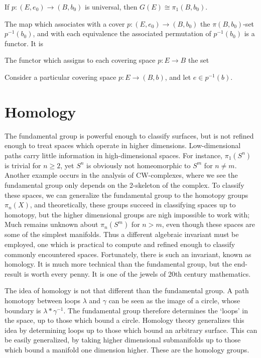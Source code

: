 \begin{corollary}
    If $p: (E,e_0) \to (B,b_0)$ is universal, then $G(E) \cong \pi_1(B,b_0)$.
\end{corollary}

The map which associates with a cover $p: (E,e_0) \to (B,b_0)$ the $\pi(B,b_0)$-set $p^{-1}(b_0)$, and with each equivalence the associated permutation of $p^{-1}(b_0)$ is a functor. It is

The functor which assigns to each covering space $p: E \to B$ the set 

Consider a particular covering space $p: E \to (B,b)$, and let $e \in p^{-1}(b)$.






\chapter{Homology}

The fundamental group is powerful enough to classify surfaces, but is not refined enough to treat spaces which operate in higher dimensions. Low-dimensional paths carry little information in high-dimensional spaces. For instance, $\pi_1(S^n)$ is trivial for $n \geq 2$, yet $S^n$ is obviously not homeomorphic to $S^m$ for $n \neq m$. Another example occurs in the analysis of CW-complexes, where we see the fundamental group only depends on the 2-skeleton of the complex. To classify these spaces, we can generalize the fundamental group to the homotopy groups $\pi_n(X)$, and theoretically, these groups succeed in classifying spaces up to homotopy, but the higher dimensional groups are nigh impossible to work with; Much remains unknown about $\pi_n(S^m)$ for $n > m$, even though these spaces are some of the simplest manifolds. Thus a different algebraic invariant must be employed, one which is practical to compute and refined enough to classify commonly encountered spaces. Fortunately, there is such an invariant, known as homology. It is much more technical than the fundamental group, but the end-result is worth every penny. It is one of the jewels of 20th century mathematics.

The idea of homology is not that different than the fundamental group. A path homotopy between loops $\lambda$ and $\gamma$ can be seen as the image of a circle, whose boundary is $\lambda * \gamma^{-1}$. The fundamental group therefore determines the `loops' in the space, up to those which bound a circle. Homology theory generalizes this idea by determining loops up to those which bound an arbitrary surface. This can be easily generalized, by taking higher dimensional submanifolds up to those which bound a manifold one dimension higher. These are the homology groups.

